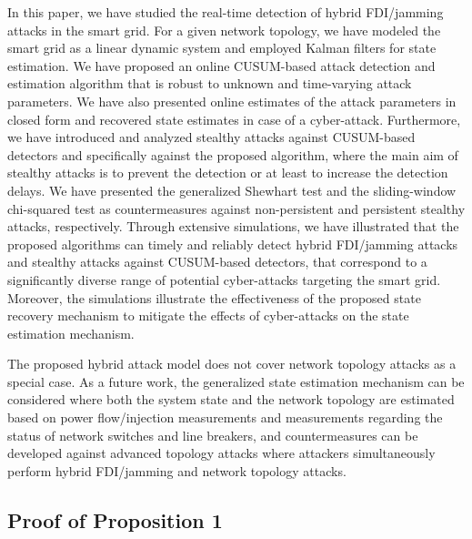 \documentclass[onecolumn]{IEEEtran}
\begin{document}
In this paper, we have studied the real-time detection of hybrid FDI/jamming attacks in the smart grid. {For a given network topology, we have modeled the smart grid as a linear dynamic system and employed Kalman filters for state estimation.} We have proposed an online CUSUM-based attack detection and estimation algorithm that is robust to unknown and time-varying attack parameters. We have also presented online estimates of the attack parameters in closed form and recovered state estimates in case of a cyber-attack. Furthermore, we have introduced and analyzed stealthy attacks against CUSUM-based detectors and specifically against the proposed algorithm, where the main aim of stealthy attacks is to prevent the detection or at least to increase the detection delays. {We have presented the generalized Shewhart test and the sliding-window chi-squared test as countermeasures against non-persistent and persistent stealthy attacks, respectively.} Through extensive simulations, we have illustrated that the proposed algorithms can timely and reliably detect {hybrid FDI/jamming attacks and stealthy attacks against CUSUM-based detectors, that correspond to} a significantly diverse range of potential cyber-attacks targeting the smart grid. {Moreover, the simulations illustrate the effectiveness of the proposed state recovery mechanism to mitigate the effects of cyber-attacks on the state estimation mechanism.}

{The proposed hybrid attack model does not cover network topology attacks as a special case. As a future work, the generalized state estimation mechanism \cite{Alsac98} can be considered where both the system state and the network topology are estimated based on power flow/injection measurements and measurements regarding the status of network switches and line breakers, and countermeasures can be developed against advanced topology attacks where attackers simultaneously perform hybrid FDI/jamming and network topology attacks.}

\appendix

\subsection{Proof of Proposition 1} \label{sec:proof_prop1}
\end{document}
